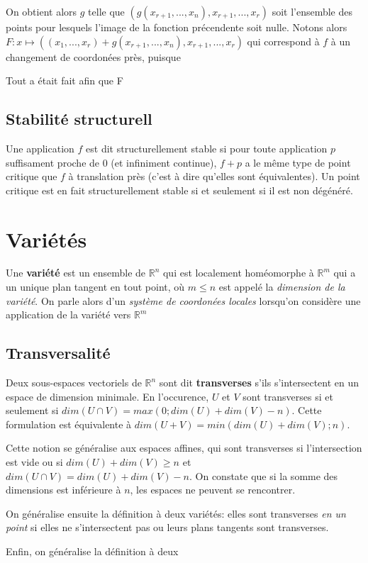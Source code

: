 \documentclass{article}
\begin{document}
On obtient alors $g$ telle que $(g(x_{r+1},...,x_n),x_{r+1},...,x_{r})$ soit l'ensemble des points pour lesquels l'image de la fonction précendente soit nulle. Notons alors $F: x\mapsto ((x_1,...,x_r)+g(x_{r+1},...,x_n),x_{r+1},...,x_{r})$ qui correspond à $f$ à un changement de coordonées près, puisque

Tout a était fait afin que F

\subsection{Stabilité structurell}

Une application $f$ est dit structurellement stable si pour toute application $p$ suffisament proche de 0 (et infiniment continue), $f+p$ a le même type de point critique que $f$ à translation près (c'est à dire qu'elles sont équivalentes). Un point critique est en fait structurellement stable si et seulement si il est non dégénéré.

\section{Variétés}

Une \textbf{variété} est un ensemble de $\mathbb{R}^n$ qui est localement homéomorphe à $\mathbb{R}^m$ qui a un unique plan tangent en tout point, où $m\leq n$ est appelé la \textit{dimension de la variété}. On parle alors d'un \textit{système de coordonées locales} lorsqu'on considère une application de la variété vers $\mathbb{R}^m$

\subsection{Transversalité}

Deux sous-espaces vectoriels de $\mathbb{R}^n$ sont dit \textbf{transverses} s'ils s'intersectent en un espace de dimension minimale. En l'occurence, $U$ et $V$ sont transverses si et seulement si $dim(U\cap V)=max(0;dim(U)+dim(V)-n)$. Cette formulation est équivalente à $dim(U+V)=min(dim(U)+dim(V); n)$.

Cette notion se généralise aux espaces affines, qui sont transverses si l'intersection est vide ou si $dim(U)+dim(V)\geq n$ et $dim(U\cap V)=dim(U)+dim(V)-n$. On constate que si la somme des dimensions est inférieure à $n$, les espaces ne peuvent se rencontrer.

On généralise ensuite la définition à deux variétés: elles sont transverses \textit{en un point} si elles ne s'intersectent pas ou leurs plans tangents sont transverses.

Enfin, on généralise la définition à deux
\end{document}
